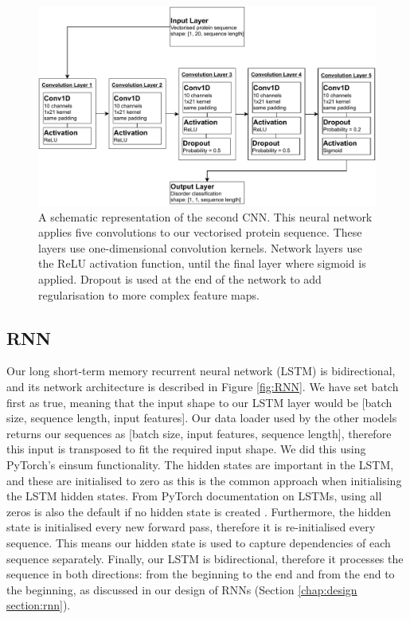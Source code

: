 \documentclass{l4proj}
\begin{document}
\begin{figure}
    \centering
    \includegraphics[width=0.95\linewidth]{images/1DCNNdraw.pdf}    

    \caption{A schematic representation of the second CNN. This neural network applies five convolutions to our vectorised protein sequence. These layers use one-dimensional convolution kernels. Network layers use the ReLU activation function, until the final layer where sigmoid is applied. Dropout is used at the end of the network to add regularisation to more complex feature maps.}

    \label{fig:2DCNN} 
\end{figure}


\subsection{RNN}

Our long short-term memory recurrent neural network (LSTM) is bidirectional, and its network architecture is described in Figure \ref{fig:RNN}. We have set batch first as true, meaning that the input shape to our LSTM layer would be [batch size, sequence length, input features]. Our data loader used by the other models returns our sequences as [batch size, input features, sequence length], therefore this input is transposed to fit the required input shape. We did this using PyTorch’s einsum functionality. The hidden states are important in the LSTM, and these are initialised to zero as this is the common approach when initialising the LSTM hidden states. From PyTorch documentation on LSTMs, using all zeros is also the default if no hidden state is created \citep{pytorch}. Furthermore, the hidden state is initialised every new forward pass, therefore it is re-initialised every sequence. This means our hidden state is used to capture dependencies of each sequence separately. Finally, our LSTM is bidirectional, therefore it processes the sequence in both directions: from the beginning to the end and from the end to the beginning, as discussed in our design of RNNs (Section \ref{chap:design section:rnn}).
\end{document}
